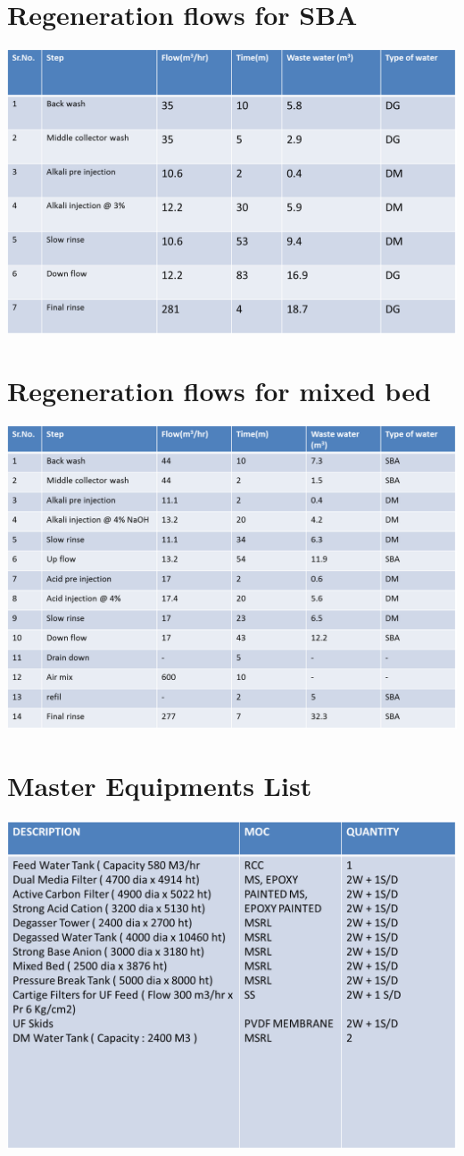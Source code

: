 \documentclass[english,11pt]{report}
\begin{document}
\section{Regeneration flows for SBA}
\includegraphics[width = 6in]{dm5.png}
\section{Regeneration flows for mixed bed}
\includegraphics[width = 6in]{dm6.png}
\section{Master Equipments List}
\includegraphics[width = 6in]{dm7.png}
\end{document}
